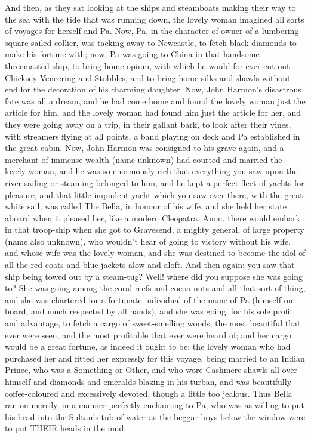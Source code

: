 And then, as they sat looking at the ships and steamboats making their
way to the sea with the tide that was running down, the lovely woman
imagined all sorts of voyages for herself and Pa. Now, Pa, in the
character of owner of a lumbering square-sailed collier, was tacking
away to Newcastle, to fetch black diamonds to make his fortune with;
now, Pa was going to China in that handsome threemasted ship, to bring
home opium, with which he would for ever cut out Chicksey Veneering
and Stobbles, and to bring home silks and shawls without end for the
decoration of his charming daughter. Now, John Harmon’s disastrous fate
was all a dream, and he had come home and found the lovely woman just
the article for him, and the lovely woman had found him just the article
for her, and they were going away on a trip, in their gallant bark,
to look after their vines, with streamers flying at all points, a band
playing on deck and Pa established in the great cabin. Now, John Harmon
was consigned to his grave again, and a merchant of immense wealth
(name unknown) had courted and married the lovely woman, and he was
so enormously rich that everything you saw upon the river sailing or
steaming belonged to him, and he kept a perfect fleet of yachts for
pleasure, and that little impudent yacht which you saw over there, with
the great white sail, was called The Bella, in honour of his wife, and
she held her state aboard when it pleased her, like a modern Cleopatra.
Anon, there would embark in that troop-ship when she got to Gravesend, a
mighty general, of large property (name also unknown), who wouldn’t
hear of going to victory without his wife, and whose wife was the lovely
woman, and she was destined to become the idol of all the red coats and
blue jackets alow and aloft. And then again: you saw that ship being
towed out by a steam-tug? Well! where did you suppose she was going to?
She was going among the coral reefs and cocoa-nuts and all that sort of
thing, and she was chartered for a fortunate individual of the name
of Pa (himself on board, and much respected by all hands), and she
was going, for his sole profit and advantage, to fetch a cargo of
sweet-smelling woods, the most beautiful that ever were seen, and the
most profitable that ever were heard of; and her cargo would be a great
fortune, as indeed it ought to be: the lovely woman who had purchased
her and fitted her expressly for this voyage, being married to an Indian
Prince, who was a Something-or-Other, and who wore Cashmere shawls all
over himself and diamonds and emeralds blazing in his turban, and was
beautifully coffee-coloured and excessively devoted, though a little too
jealous. Thus Bella ran on merrily, in a manner perfectly enchanting to
Pa, who was as willing to put his head into the Sultan’s tub of water as
the beggar-boys below the window were to put THEIR heads in the mud.

